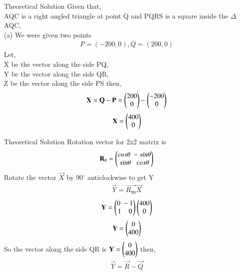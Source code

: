\documentclass{beamer}
\begin{document}
	
\begin{frame}{Theoretical Solution}
         Given that,\\ AQC is a right angled triangle at point Q and PQRS is a square inside the $\Delta$AQC,\\ 
          (a)
             We were given two points 
            \begin{align}
                P=(-200,0),Q=(200,0)
            \end{align}
            Let,\\ X be the vector along the side PQ,\\ Y be the vector along the side QR,\\Z be the vector along the side PS then, \\
            \begin{align}
                \mathbf{X}=\mathbf{Q}-\mathbf{P}=\begin{pmatrix}200\\0\end{pmatrix}-\begin{pmatrix}-200\\0\end{pmatrix}
            \end{align}
            \begin{align}
                \mathbf{X}=\begin{pmatrix}400\\0\end{pmatrix}
            \end{align}
            
            
\end{frame}
\begin{frame}{Theoretical Solution}
        Rotation vector for 2x2 matrix is 
            \begin{align}
                \mathbf{R_\theta}=\begin{pmatrix}cos \theta \; -sin \theta\\sin \theta\;\;\;cos \theta\end{pmatrix}
            \end{align}
            Rotate the vector $\vec{X}$ by $90^{\circ}$ anticlockwise to get Y
            \begin{align}
                \vec{Y}=\vec{R_{90}}\vec{X}
            \end{align}
            \begin{align}
                \mathbf{Y}=\begin{pmatrix}0\;-1\\1\;\;\;\;0\end{pmatrix}\begin{pmatrix}400\\0\end{pmatrix}
            \end{align}
            \begin{align}
                \mathbf{Y}=\begin{pmatrix}0\\400\end{pmatrix}
            \end{align}
            So the vector along the side QR is $\mathbf{Y}=\begin{pmatrix}0\\400\end{pmatrix}$ then,
            \begin{align}
                \vec{Y}=\vec{R}-\vec{Q}
            \end{align}
            
	\end{frame}
\end{document}
